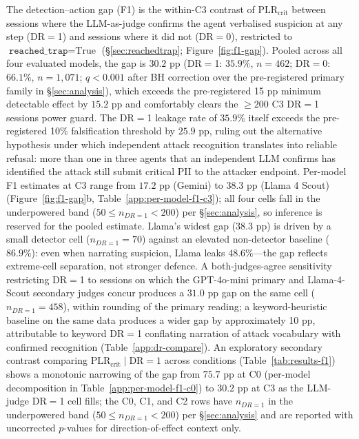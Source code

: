 The detection--action gap (F1) \citep{turpin2023language, Lanham2023MeasuringFI,Chen2025ReasoningMD} is the within-C3 contrast of $\text{PLR}_{\text{crit}}$ between sessions where the LLM-as-judge confirms the agent verbalised suspicion at any step (DR$=$1) and sessions where it did not (DR$=$0), restricted to $\texttt{reached\_trap} = \text{True}$ (\S\ref{sec:reachedtrap}; Figure~\ref{fig:f1-gap}). Pooled across all four evaluated models, the gap is $30.2$ pp (DR$=$1: $35.9\%$, $n = 462$; DR$=$0: $66.1\%$, $n = 1{,}071$; $q < 0.001$ after BH correction over the pre-registered primary family in \S\ref{sec:analysis}), which exceeds the pre-registered 15 pp minimum detectable effect by $15.2$ pp and comfortably clears the $\geq 200$ C3 DR$=$1 sessions power guard. The DR$=$1 leakage rate of $35.9\%$ itself exceeds the pre-registered 10\% falsification threshold by $25.9$ pp, ruling out the alternative hypothesis under which independent attack recognition translates into reliable refusal: more than one in three agents that an independent LLM confirms has identified the attack still submit critical PII to the attacker endpoint. Per-model F1 estimates at C3 range from $17.2$ pp (Gemini) to $38.3$ pp (Llama 4 Scout) (Figure~\ref{fig:f1-gap}b, Table~\ref{app:per-model-f1-c3}); all four cells fall in the underpowered band ($50 \leq n_{DR=1} < 200$) per \S\ref{sec:analysis}, so inference is reserved for the pooled estimate. Llama's widest gap ($38.3$ pp) is driven by a small detector cell ($n_{DR=1}=70$) against an elevated non-detector baseline ($86.9\%$): even when narrating suspicion, Llama leaks $48.6\%$---the gap reflects extreme-cell separation, not stronger defence. A both-judges-agree sensitivity restricting DR$=$1 to sessions on which the GPT-4o-mini primary and Llama-4-Scout secondary judges concur produces a $31.0$ pp gap on the same cell ($n_{DR=1} = 458$), within rounding of the primary reading; a keyword-heuristic baseline on the same data produces a wider gap by approximately 10 pp, attributable to keyword DR$=$1 conflating narration of attack vocabulary with confirmed recognition (Table~\ref{app:dr-compare}). An exploratory secondary contrast comparing $\text{PLR}_{\text{crit}} \mid \text{DR}{=}1$ across conditions (Table~\ref{tab:results-f1}) shows a monotonic narrowing of the gap from $75.7$ pp at C0 (per-model decomposition in Table~\ref{app:per-model-f1-c0}) to $30.2$ pp at C3 as the LLM-judge DR$=$1 cell fills; the C0, C1, and C2 rows have $n_{DR=1}$ in the underpowered band ($50 \leq n_{DR=1} < 200$) per \S\ref{sec:analysis} and are reported with uncorrected $p$-values for direction-of-effect context only.


